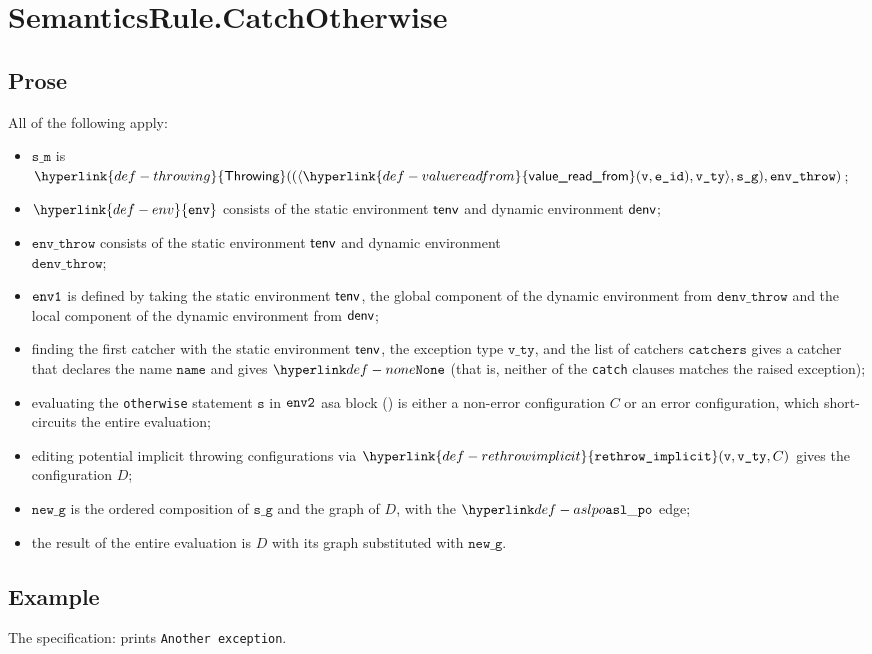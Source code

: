 \documentclass{book}
\newcommand\ProseOrError[0]{or an error configuration, which short-circuits the entire evaluation}
\newcommand\rethrowimplicit[0]{\hyperlink{def-rethrowimplicit}{\texttt{rethrow\_implicit}}}
\newcommand\valuereadfrom[0]{\hyperlink{def-valuereadfrom}{\textsf{value\_read\_from}}}
\newcommand\Throwing[0]{\hyperlink{def-throwing}{\textsf{Throwing}}}
\newcommand\env[0]{\hyperlink{def-env}{\texttt{env}}}
\newcommand\newg[0]{\texttt{new\_g}}
\newcommand\vs[0]{\texttt{s}}
\newcommand\name[0]{\texttt{name}}
\newcommand\catchers[0]{\texttt{catchers}}
\newcommand\envthrow[0]{\texttt{env\_throw}}
\newcommand\denvthrow[0]{\texttt{denv\_throw}}
\newcommand\sm[0]{\texttt{s\_m}}
\newcommand\sg[0]{\texttt{s\_g}}
\newcommand\vvty[0]{\texttt{v\_ty}}
\newcommand\eid[0]{\texttt{e\_id}}
\begin{document}
\section{SemanticsRule.CatchOtherwise \label{sec:SemanticsRule.CatchOtherwise}}
  \subsection{Prose}
  All of the following apply:
  \begin{itemize}
    \item $\sm$ is $\Throwing((\langle \valuereadfrom(\vv, \eid), \vvty \rangle, \sg), \envthrow)$;
    \item $\env$ consists of the static environment $\textsf{tenv}$ and dynamic environment $\textsf{denv}$;
    \item $\envthrow$ consists of the static environment $\textsf{tenv}$ and dynamic environment \\ $\denvthrow$;
    \item $\texttt{env1}$ is defined by taking the static environment $\textsf{tenv}$, the global component of the dynamic
    environment from $\denvthrow$ and the local component of the dynamic environment from $\textsf{denv}$;
    \item finding the first catcher with the static environment $\textsf{tenv}$, the exception type $\vvty$,
    and the list of catchers $\catchers$ gives a catcher that declares the name $\name$ and gives $\None$
    (that is, neither of the \texttt{catch} clauses matches the raised exception);
    \item evaluating the \texttt{otherwise} statement $\vs$ in $\texttt{env2}$ asa block ()
    is either a non-error configuration $C$ \ProseOrError;
    \item editing potential implicit throwing configurations via $\rethrowimplicit(\vv, \vvty, C)$
    gives the configuration $D$;
    \item $\newg$ is the ordered composition of $\sg$ and the graph of $D$,
    with the $\aslpo$ edge;
    \item the result of the entire evaluation is $D$ with its graph substituted with $\newg$.
  \end{itemize}

    \subsection{Example}
     The specification:
     prints \texttt{Another exception}.
\end{document}
